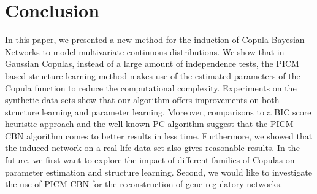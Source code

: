 \documentclass{article}
\begin{document}
\section{Conclusion}
\label{sec:conc}
In this paper, we presented a new method for the induction of Copula Bayesian Networks
to model multivariate continuous distributions. 
We show that in Gaussian Copulas, instead of a large amount of independence tests, the PICM based structure learning method makes use of the estimated parameters of the Copula function to reduce the computational complexity. Experiments on the synthetic data sets show that our algorithm offers improvements on both structure learning and parameter learning.  
Moreover, comparisons to a BIC score heuristic-approach and the well known PC algorithm
suggest that the PICM-CBN algorithm comes to better results in less time.
Furthermore, we showed that the induced network on a real life data set also gives reasonable results.
%
%
In the future, we first want to explore the impact of different families of Copulas on parameter estimation and
structure learning. Second, we would like to investigate the use of PICM-CBN for the reconstruction of gene regulatory networks.







\end{document}

